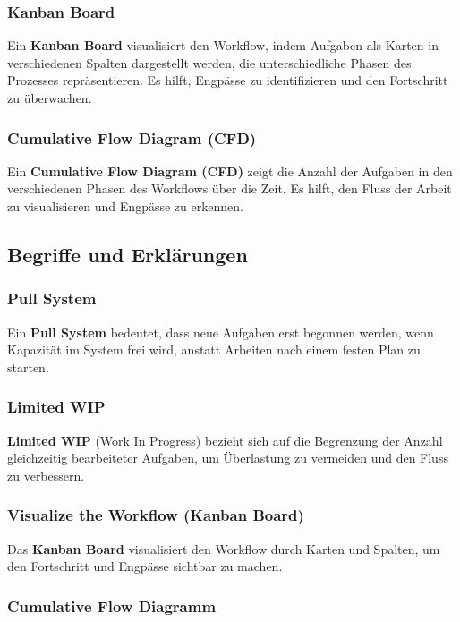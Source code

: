 \subsubsection{Kanban Board}

Ein \textbf{Kanban Board} visualisiert den Workflow, indem Aufgaben als Karten in verschiedenen Spalten dargestellt werden, die unterschiedliche Phasen des Prozesses repräsentieren. Es hilft, Engpässe zu identifizieren und den Fortschritt zu überwachen.

\subsubsection{Cumulative Flow Diagram (CFD)}

Ein \textbf{Cumulative Flow Diagram (CFD)} zeigt die Anzahl der Aufgaben in den verschiedenen Phasen des Workflows über die Zeit. Es hilft, den Fluss der Arbeit zu visualisieren und Engpässe zu erkennen.

\subsection{Begriffe und Erklärungen}

\subsubsection{Pull System}

Ein \textbf{Pull System} bedeutet, dass neue Aufgaben erst begonnen werden, wenn Kapazität im System frei wird, anstatt Arbeiten nach einem festen Plan zu starten.

\subsubsection{Limited WIP}

\textbf{Limited WIP} (Work In Progress) bezieht sich auf die Begrenzung der Anzahl gleichzeitig bearbeiteter Aufgaben, um Überlastung zu vermeiden und den Fluss zu verbessern.

\subsubsection{Visualize the Workflow (Kanban Board)}

Das \textbf{Kanban Board} visualisiert den Workflow durch Karten und Spalten, um den Fortschritt und Engpässe sichtbar zu machen.

\subsubsection{Cumulative Flow Diagramm}

